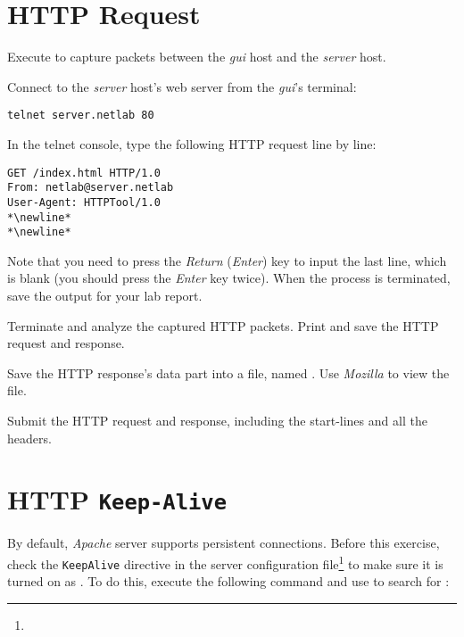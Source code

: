 \documentclass{../UTNetLab}
\begin{document}
\section{HTTP Request}
Execute  to capture packets between the \textit{gui} host and the \textit{server} host.

Connect to the \textit{server} host’s web server from the \textit{gui}'s terminal:

\begin{lstlisting}[emph={server,netlab}]
telnet server.netlab 80
\end{lstlisting}

In the telnet console, type the following HTTP request line by line:

\begin{lstlisting}[language={HTTP},morekeywords={[2]GET,From,User-Agent},escapechar=*,emph={server,netlab},breaklines=true,breakatwhitespace=true,]
GET /index.html HTTP/1.0
From: netlab@server.netlab
User-Agent: HTTPTool/1.0
*\newline*
*\newline*
\end{lstlisting}

Note that you need to press the \textit{Return} (\textit{Enter}) key to input the last line, which is blank (you should press the \textit{Enter} key twice).
When the  process is terminated, save the output for your lab report.

Terminate  and analyze the captured HTTP packets.
Print and save the HTTP request and response.

Save the HTTP response’s data part into a file, named .
Use \textit{Mozilla} to view the file.

\begin{report}
    \item Submit the HTTP request and response, including the start-lines and all the headers.
\end{report}


\section{HTTP \texttt{Keep-Alive}}
By default, \textit{Apache} server supports persistent connections. Before this exercise, check the \texttt{KeepAlive} directive in the server configuration file\footnote{} to make sure it is turned on as .
To do this, execute the following command and use  to search for :
\end{document}
